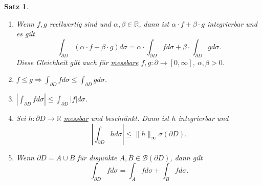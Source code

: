\documentclass[a4paper]{scrreprt}
\newcommand{\R}{\mathbb{R}}
\newcommand{\Borel}{\mathcal{B}}
\newcommand{\dcup}{\dot{\cup}}
\newcommand{\jlabel}[1]{\label{j_#1}}
\newcommand{\jhyperref}[2]{\hyperref[j_#1]{#2}}
\newcommand{\jlink}[1]{\jhyperref{#1}{#1}}
\newcommand{\jabb}[3]{ #1: #2 \rightarrow #3 }
\theoremstyle{plain}
\newtheorem{satz}[thm]{Satz}
\theoremstyle{definition}
\begin{document}
{{{{\begin{satz}
\begin{enumerate}
        \item
            \jlabel{Satz 4.14c)}
            Wenn $f,g$ reellwertig sind und $\alpha,\beta \in \R$, dann ist $\alpha\cdot f + \beta \cdot g$ integrierbar und es gilt
            \[
                \int_{\partial D} (\alpha\cdot f + \beta\cdot g) d\sigma = \alpha\cdot \int_{\partial D} f d\sigma + \beta \cdot \int_{\partial D} g d\sigma.
            \]
            Diese Gleichheit gilt auch für \jhyperref{messbar}{messbare} $\jabb{f,g}{\partial}{[0,\infty]}$, $\alpha,\beta >0$.
        \item
            \jlabel{Satz 4.14d)}
            $f\le g \Rightarrow \int_{\partial D} f d\sigma \le \int_{\partial D} g d\sigma$.
        \item
            \jlabel{Satz 4.14e)}
            $\left | \int_{\partial D} f d\sigma \right | \le \int_{\partial D} |f|d\sigma$.
        \item
            \jlabel{Satz 4.14f)}
            Sei $\jabb{h}{\partial D}{\R}$ \jlink{messbar} und beschränkt. Dann ist $h$ integrierbar und
            \[
                \left | \int_{\partial D} h d\sigma \right | \le \lVert h \rVert_\infty \sigma(\partial D).
            \]

        \item
            \jlabel{Satz 4.14g)}
            Wenn $\partial D = A \dcup B$ für disjunkte $A,B \in \Borel(\partial D)$, dann gilt
            \[
                \int_{\partial D} f d\sigma = \int_A f d\sigma + \int_B f d\sigma.
            \]


\end{enumerate}
\end{satz}}}}}
\end{document}
